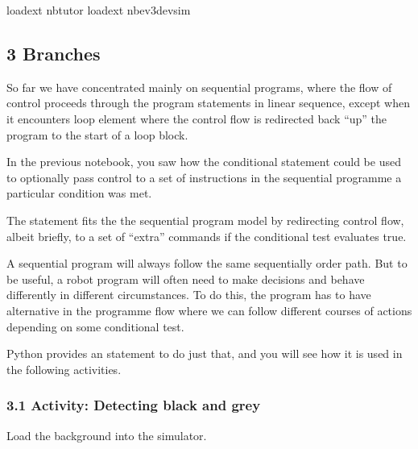 \documentclass[letterpaper,10pt,english]{sphinxmanual}
\begin{document}
{
\begin{sphinxVerbatim}[commandchars=\\\{\}]
\llap{\color{nbsphinxin}[ ]:\,\hspace{\fboxrule}\hspace{\fboxsep}}\PYGZpc{}load\PYGZus{}ext nbtutor
\PYGZpc{}load\PYGZus{}ext nbev3devsim
\end{sphinxVerbatim}
}


\subsection{3 Branches}
\label{\detokenize{content/02_Robot_Lab/Section_00_02:3-Branches}}\label{\detokenize{content/02_Robot_Lab/Section_00_02::doc}}
So far we have concentrated mainly on sequential programs, where the flow of control proceeds through the program statements in linear sequence, except when it encounters loop element where the control flow is redirected back “up” the program to the start of a loop block.

In the previous notebook, you saw how the conditional  statement could be used to optionally pass control to a set of instructions in the sequential programme  a particular condition was met.

The  statement fits the the sequential program model by redirecting control flow, albeit briefly, to a set of “extra” commands if the conditional test evaluates true.

A sequential program will always follow the same sequentially order path. But to be useful, a robot program will often need to make decisions and behave differently in different circumstances. To do this, the program has to have alternative  in the programme flow where we can follow different courses of actions depending on some conditional test.

Python provides an  statement to do just that, and you will see how it is used in the following activities.



\subsubsection{3.1 Activity: Detecting black and grey}
\label{\detokenize{content/02_Robot_Lab/Section_00_02:3.1-Activity:-Detecting-black-and-grey}}
Load the  background into the simulator.
\end{document}
